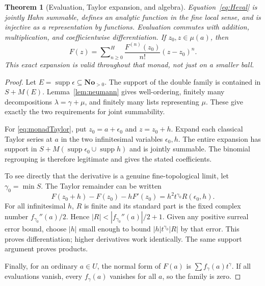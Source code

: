 \documentclass[11pt,a4paper]{article}
\newtheorem{theorem}{Theorem}[section]
\theoremstyle{definition}
\theoremstyle{remark}
\newcommand{\No}{\mathbf{No}}
\newcommand{\supp}{\operatorname{supp}}
\newcommand{\Hs}{\mathop{\sum}\nolimits^{\!H}}
\begin{document}
\begin{theorem}[Evaluation, Taylor expansion, and algebra]\label{thm:Heval}
Equation~\eqref{eq:Heval} is jointly Hahn summable, defines an analytic
function in the fine local sense, and is injective as a representation
by functions. Evaluation commutes with addition, multiplication, and
coefficientwise differentiation. If $z_0,z\in\mu(a)$, then
\begin{equation}\label{eq:monadTaylor}
 F(z)=\Hs_{n\ge0}\frac{F^{(n)}(z_0)}{n!}(z-z_0)^n.
\end{equation}
This exact expansion is valid throughout that monad, not just on a
smaller ball.
\end{theorem}
\begin{proof}
Let $E=\supp\epsilon\subseteq\No_{>0}$. The support of the double
family is contained in $S+M(E)$. Lemma~\ref{lem:neumann} gives
well-ordering, finitely many decompositions $\lambda=\gamma+\mu$,
and finitely many lists representing $\mu$. These give exactly the
two requirements for joint summability.

For \eqref{eq:monadTaylor}, put $z_0=a+\epsilon_0$ and $z=z_0+h$.
Expand each classical Taylor series at $a$ in the two infinitesimal
variables $\epsilon_0,h$. The entire expansion has support in
$S+M(\supp\epsilon_0\cup\supp h)$ and is jointly summable. The
binomial regrouping is therefore legitimate and gives the stated
coefficients.

To see directly that the derivative is a genuine fine-topological
limit, let $\gamma_0=\min S$. The Taylor remainder can be written
\[
 F(z_0+h)-F(z_0)-hF'(z_0)=h^2t^{\gamma_0}R(\epsilon_0,h).
\]
For all infinitesimal $h$, $R$ is finite and its standard part is the
fixed complex number $f_{\gamma_0}''(a)/2$. Hence
$|R|<|f_{\gamma_0}''(a)|/2+1$. Given any positive surreal error bound,
choose $|h|$ small enough to bound
$|h|t^{\gamma_0}|R|$ by that error. This proves differentiation;
higher derivatives work identically. The same support argument proves
products.

Finally, for an ordinary $a\in U$, the normal form of $F(a)$ is
$\sum f_\gamma(a)t^\gamma$. If all evaluations vanish, every
$f_\gamma(a)$ vanishes for all $a$, so the family is zero.
\end{proof}
\end{document}
